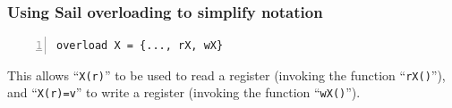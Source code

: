 \documentclass[aspectratio=169]{beamer}
\newcommand{\slidefont}{\scriptsize}
\newcommand{\cf}{\scriptsize\tt}
\begin{document}

\begin{frame}[fragile]
  \frametitle{Using Sail overloading to simplify notation}

  \slidefont

  \begin{Verbatim}[frame=single, numbers=left, label = File riscv\_regs.sail]
overload X = {..., rX, wX}
  \end{Verbatim}

  \begin{minipage}{\textwidth}
    This allows ``{\cf X(r)}'' to be used to read a register (invoking the function ``{\cf rX()}''), \\
    and ``{\cf X(r)=v}'' to write a register (invoking the function ``{\cf wX()}'').
  \end{minipage}

\end{frame}



\end{document}
